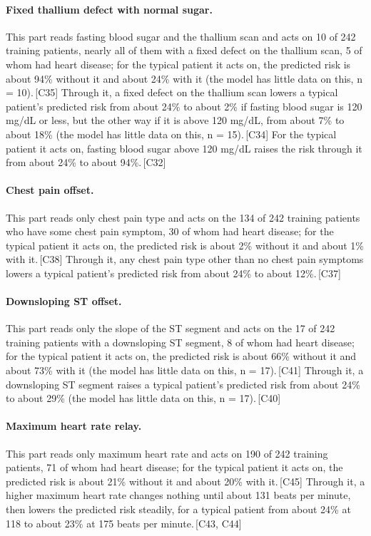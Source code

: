 \documentclass[a4paper,10pt]{article}
\newif\ifreviewmarks
\newcommand{\reviewrule}{\noindent{\color{BrickRed}\rule{\linewidth}{0.8pt}}}
\newenvironment{drafted}[1][]{%
  \ifreviewmarks\par\addvspace{\medskipamount}\reviewrule\par\nopagebreak
  \noindent{\color{BrickRed}\sffamily\footnotesize\textbf{Thesis Draft}\quad #1\hfill review}\par\nopagebreak\smallskip\fi}{%
  \ifreviewmarks\par\smallskip\noindent{\color{BrickRed}\sffamily\footnotesize end of thesis draft}\par\nopagebreak\reviewrule\par\medskip\fi}
\begin{document}
\begin{drafted}[plain-language layer: heart-s4-c1]
\paragraph{Fixed thallium defect with normal sugar.} This part reads fasting blood sugar and the thallium scan and acts on 10 of 242 training patients, nearly all of them with a fixed defect on the thallium scan, 5 of whom had heart disease; for the typical patient it acts on, the predicted risk is about 94\% without it and about 24\% with it (the model has little data on this, n = 10).\,{\scriptsize\textcolor{NavyBlue}{[C35]}} Through it, a fixed defect on the thallium scan lowers a typical patient's predicted risk from about 24\% to about 2\% if fasting blood sugar is 120 mg/dL or less, but the other way if it is above 120 mg/dL, from about 7\% to about 18\% (the model has little data on this, n = 15).\,{\scriptsize\textcolor{NavyBlue}{[C34]}} For the typical patient it acts on, fasting blood sugar above 120 mg/dL raises the risk through it from about 24\% to about 94\%.\,{\scriptsize\textcolor{NavyBlue}{[C32]}}
\paragraph{Chest pain offset.} This part reads only chest pain type and acts on the 134 of 242 training patients who have some chest pain symptom, 30 of whom had heart disease; for the typical patient it acts on, the predicted risk is about 2\% without it and about 1\% with it.\,{\scriptsize\textcolor{NavyBlue}{[C38]}} Through it, any chest pain type other than no chest pain symptoms lowers a typical patient's predicted risk from about 24\% to about 12\%.\,{\scriptsize\textcolor{NavyBlue}{[C37]}}
\paragraph{Downsloping ST offset.} This part reads only the slope of the ST segment and acts on the 17 of 242 training patients with a downsloping ST segment, 8 of whom had heart disease; for the typical patient it acts on, the predicted risk is about 66\% without it and about 73\% with it (the model has little data on this, n = 17).\,{\scriptsize\textcolor{NavyBlue}{[C41]}} Through it, a downsloping ST segment raises a typical patient's predicted risk from about 24\% to about 29\% (the model has little data on this, n = 17).\,{\scriptsize\textcolor{NavyBlue}{[C40]}}
\paragraph{Maximum heart rate relay.} This part reads only maximum heart rate and acts on 190 of 242 training patients, 71 of whom had heart disease; for the typical patient it acts on, the predicted risk is about 21\% without it and about 20\% with it.\,{\scriptsize\textcolor{NavyBlue}{[C45]}} Through it, a higher maximum heart rate changes nothing until about 131 beats per minute, then lowers the predicted risk steadily, for a typical patient from about 24\% at 118 to about 23\% at 175 beats per minute.\,{\scriptsize\textcolor{NavyBlue}{[C43, C44]}}

\end{drafted}
\end{document}
